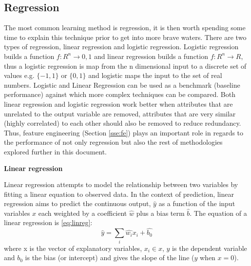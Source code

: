 \documentclass[11pt]{article}
\theoremstyle{definition}
\theoremstyle{remark}
\begin{document}
\subsection{Regression}
\label{sse:logreg}
The most common learning method is regression, it is then worth spending some time to explain this technique prior to get into more brave waters. 
There are two types of regression, linear regression and logistic regression. Logistic regression builds a function $f:R^n \to {0,1}$ and linear regression builds a function $f:R^n \to R$, thus a logistic regression is map from the n dimensional input to a discrete set of values e.g. $\{-1,1\}$ or $\{0,1\}$ and logistic maps the input to the set of real numbers. Logistic and Linear Regression can be used as a benchmark (baseline performance) against which more complex techniques can be compared. 
Both linear regression and logistic regression work better when attributes that are unrelated to the output variable are removed, attributes that are very similar (highly correlated) to each other should also be removed to reduce redundancy. Thus, feature engineering (Section \ref{sse:fe}) plays an important role in regards to the performance of not only regression but also the rest of methodologies explored further in this document. 

\textbf{Linear regression}

Linear regression attempts to model the relationship between two variables by fitting a linear equation to observed data. In the context of prediction, linear regression aims to predict the continuous output, $\hat{y}$ as a function of the input variables $x$ each weighted by a coefficient $\hat{w}$ plus a bias term $\hat{b}$. The equation of a linear regression is \ref{eq:linreg}:
\begin{equation}
\hat{y} = \sum_i \hat{w_i}x_i + \hat{b_0}
\label{eq:linreg1}
\end{equation}
where x is the vector of explanatory variables, $x_i \in x$, $y$ is the dependent variable and $b_0$ is the bias (or intercept) and gives the slope of the line ($y$ when $x=0$). 
\end{document}
